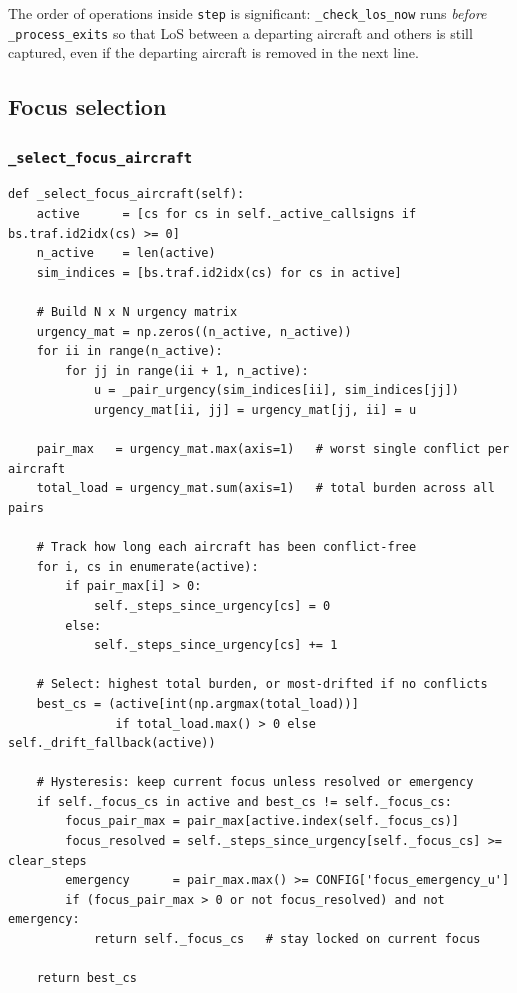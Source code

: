 \documentclass[11pt, a4paper]{article}
\begin{document}
The order of operations inside \texttt{step} is significant:
\texttt{\_check\_los\_now} runs \emph{before} \texttt{\_process\_exits} so that
LoS between a departing aircraft and others is still captured, even if the
departing aircraft is removed in the next line.

\subsection{Focus selection}

\subsubsection{\texttt{\_select\_focus\_aircraft}}

\begin{lstlisting}[caption={Selecting which aircraft receives the next instruction.}]
def _select_focus_aircraft(self):
    active      = [cs for cs in self._active_callsigns if bs.traf.id2idx(cs) >= 0]
    n_active    = len(active)
    sim_indices = [bs.traf.id2idx(cs) for cs in active]

    # Build N x N urgency matrix
    urgency_mat = np.zeros((n_active, n_active))
    for ii in range(n_active):
        for jj in range(ii + 1, n_active):
            u = _pair_urgency(sim_indices[ii], sim_indices[jj])
            urgency_mat[ii, jj] = urgency_mat[jj, ii] = u

    pair_max   = urgency_mat.max(axis=1)   # worst single conflict per aircraft
    total_load = urgency_mat.sum(axis=1)   # total burden across all pairs

    # Track how long each aircraft has been conflict-free
    for i, cs in enumerate(active):
        if pair_max[i] > 0:
            self._steps_since_urgency[cs] = 0
        else:
            self._steps_since_urgency[cs] += 1

    # Select: highest total burden, or most-drifted if no conflicts
    best_cs = (active[int(np.argmax(total_load))]
               if total_load.max() > 0 else self._drift_fallback(active))

    # Hysteresis: keep current focus unless resolved or emergency
    if self._focus_cs in active and best_cs != self._focus_cs:
        focus_pair_max = pair_max[active.index(self._focus_cs)]
        focus_resolved = self._steps_since_urgency[self._focus_cs] >= clear_steps
        emergency      = pair_max.max() >= CONFIG['focus_emergency_u']
        if (focus_pair_max > 0 or not focus_resolved) and not emergency:
            return self._focus_cs   # stay locked on current focus

    return best_cs
\end{lstlisting}
\end{document}
